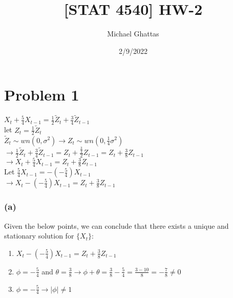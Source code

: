 \documentclass[
]{article}
\title{{[}STAT 4540{]} HW-2}
\author{Michael Ghattas}
\date{2/9/2022}
\begin{document}
\maketitle

\hypertarget{problem-1}{%
\section{Problem 1}\label{problem-1}}

\(X_{t} + \frac{5}{4} X_{t - 1} = \frac{1}{2} \tilde{Z}_{t} + \frac{3}{4} \tilde{Z}_{t - 1}\)\\

let \(Z_{t} = \frac{1}{2} \tilde{Z}_{t}\)\\

\(\tilde{Z}_{t} \sim wn(0, \sigma^2) \to Z_{t} \sim wn(0, \frac{1}{4} \sigma^2)\)\\

\(\to \frac{1}{2} \tilde{Z}_{t} + \frac{3}{4} \tilde{Z}_{t - 1} = Z_{t} + \frac{\frac{3}{4}}{2} Z_{t - 1} = Z_{t} + \frac{3}{8} Z_{t - 1}\)\\

\(\to X_{t} + \frac{5}{4} X_{t - 1} = Z_{t} + \frac{3}{8} Z_{t - 1}\)\\

Let \(\frac{5}{4} X_{t - 1} = -(-\frac{5}{4}) X_{t - 1}\)\\

\(\to X_{t} - (-\frac{5}{4}) X_{t - 1} = Z_{t} + \frac{3}{8} Z_{t - 1}\)\\

\hypertarget{a}{%
\subsubsection{(a)}\label{a}}

Given the below points, we can conclude that there exists a unique and
stationary solution for \(\{X_{t}\}\):\\

\begin{enumerate}
\def\labelenumi{\arabic{enumi}.}
\item
  \(X_{t} - (-\frac{5}{4}) X_{t - 1} = Z_{t} + \frac{3}{8} Z_{t - 1}\)\\
\item
  \(\phi = -\frac{5}{4}\) and
  \(\theta = \frac{3}{8} \to \phi + \theta = \frac{3}{8} - \frac{5}{4} = \frac{3 - 10}{8} = -\frac{7}{8} \neq 0\)\\
\item
  \(\phi = -\frac{5}{4} \to |\phi| \neq 1\)\\
\end{enumerate}
\end{document}
